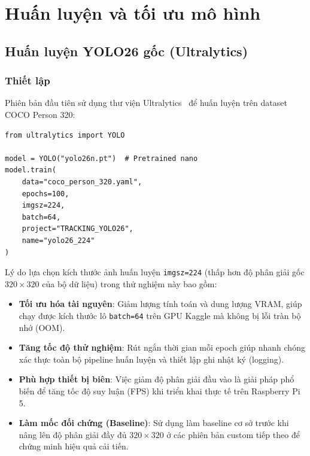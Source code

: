 \chapter{Huấn luyện và tối ưu mô hình}
\label{ch:training}

\section{Huấn luyện YOLO26 gốc (Ultralytics)}
\label{sec:train_ultralytics}

\subsection{Thiết lập}

Phiên bản đầu tiên sử dụng thư viện Ultralytics~\cite{ultralytics} để huấn luyện \yolo trên dataset COCO Person 320:

\begin{lstlisting}[caption={Huấn luyện YOLO26 gốc với Ultralytics}, label=lst:train_ultra]
from ultralytics import YOLO

model = YOLO("yolo26n.pt")  # Pretrained nano
model.train(
    data="coco_person_320.yaml",
    epochs=100,
    imgsz=224,
    batch=64,
    project="TRACKING_YOLO26",
    name="yolo26_224"
)
\end{lstlisting}

Lý do lựa chọn kích thước ảnh huấn luyện \texttt{imgsz=224} (thấp hơn độ phân giải gốc $320 \times 320$ của bộ dữ liệu) trong thử nghiệm này bao gồm:
\begin{itemize}
    \item \textbf{Tối ưu hóa tài nguyên}: Giảm lượng tính toán và dung lượng VRAM, giúp chạy được kích thước lô \texttt{batch=64} trên GPU Kaggle mà không bị lỗi tràn bộ nhớ (OOM).
    \item \textbf{Tăng tốc độ thử nghiệm}: Rút ngắn thời gian mỗi epoch giúp nhanh chóng xác thực toàn bộ pipeline huấn luyện và thiết lập ghi nhật ký (logging).
    \item \textbf{Phù hợp thiết bị biên}: Việc giảm độ phân giải đầu vào là giải pháp phổ biến để tăng tốc độ suy luận (FPS) khi triển khai thực tế trên Raspberry Pi 5.
    \item \textbf{Làm mốc đối chứng (Baseline)}: Sử dụng làm baseline cơ sở trước khi nâng lên độ phân giải đầy đủ $320 \times 320$ ở các phiên bản custom tiếp theo để chứng minh hiệu quả cải tiến.
\end{itemize}


